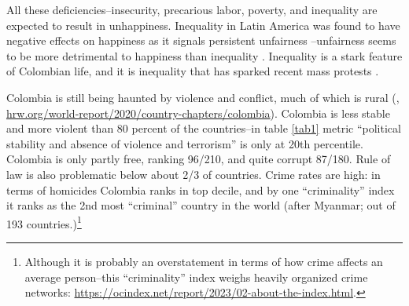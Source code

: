 \documentclass[10pt, letterpaper]{article}
\begin{document}
\begin{spacing}{2}
All these deficiencies--insecurity, precarious labor, poverty,
and inequality are expected to result in  unhappiness.  
 Inequality in Latin America was found to
have negative effects on happiness as it signals persistent
unfairness \citep{graham05}--unfairness seems to be more detrimental to
happiness than inequality \citep{starmans17}.  
Inequality is a stark feature of Colombian life, and it is inequality that has sparked recent mass protests \citep{icg21}.

Colombia is still being haunted by violence and conflict,
much of which is rural (\citet{turkewitzNYT21sep26}, \url{hrw.org/world-report/2020/country-chapters/colombia}).
 Colombia is less
stable and more violent than 80 percent of the countries--in table \ref{tab1} metric ``political
stability and absence of violence and terrorism'' is only at 20th percentile. 
Colombia is only partly free, ranking 96/210, %
  and quite corrupt  87/180.  %
Rule of law is also problematic below about 2/3 of
countries.  
 Crime rates are high: in terms of homicides Colombia ranks
in top decile, and by one ``criminality'' index it ranks as the 2nd most
``criminal'' country in the world (after Myanmar; out of 193
countries.)\footnote{Although it is probably an overstatement in terms of how
  crime affects an average person--this ``criminality'' index weighs heavily
  organized crime networks: \url{https://ocindex.net/report/2023/02-about-the-index.html}.}



\end{spacing}
\end{document}

